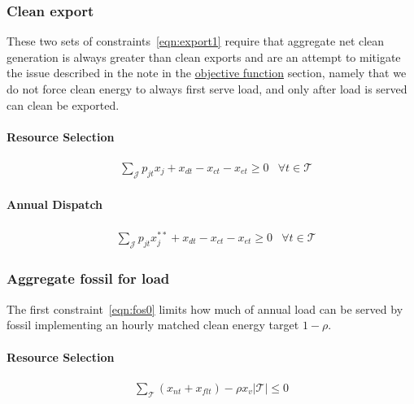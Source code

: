 \documentclass[9pt, oneside]{article}
\numberwithin{equation}{subsubsection}
\begin{document}
\subsubsection{Clean export}
These two sets of constraints~\ref{eqn:export1} require that aggregate net clean generation is always greater than clean exports and are an attempt to mitigate the issue described in the note in the \hyperref[sec:objfun]{objective function} section,
namely that we do not force clean energy to always first serve load, and only after load is served can clean be exported.

\paragraph{Resource Selection}
\begin{subequations}
	\begin{align}
		 & \sum_{ \mathcal{J}} p_{jt}x_{j} + x_{dt} - x_{ct} - x_{et} \geq 0 & \forall t \in \mathcal{T}\label{eqn:export1}
	\end{align}
\end{subequations}

\paragraph{Annual Dispatch}
\begin{subequations}
	\begin{align}
		 & \sum_{ \mathcal{J}} p_{jt}x_{j}^{**} + x_{dt} - x_{ct} - x_{et} \geq 0 & \forall t \in \mathcal{T}\label{eqn:export1}
	\end{align}
\end{subequations}

\subsubsection{Aggregate fossil for load}
The first constraint~\ref{eqn:fos0} limits how much of annual load can be served by fossil implementing an hourly matched clean energy target $1 - \rho$.

\paragraph{Resource Selection}
\begin{subequations}
	\begin{align}
		 & \sum_{ \mathcal{T}} \left( x_{nt} + x_{flt} \right) -\rho x_v |\mathcal{T}|\leq 0 & \label{eqn:fos0}
	\end{align}
\end{subequations}
\end{document}
